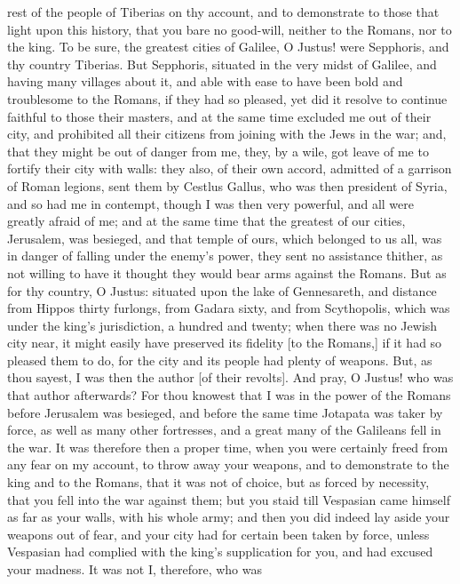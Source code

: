 rest of the people of Tiberias on thy account, and to demonstrate to those
that light upon this history, that you bare no good-will, neither to the
Romans, nor to the king. To be sure, the greatest cities of Galilee, O
Justus! were Sepphoris, and thy country Tiberias. But Sepphoris, situated
in the very midst of Galilee, and having many villages about it, and able
with ease to have been bold and troublesome to the Romans, if they had so
pleased, yet did it resolve to continue faithful to those their masters,
and at the same time excluded me out of their city, and prohibited all
their citizens from joining with the Jews in the war; and, that they might
be out of danger from me, they, by a wile, got leave of me to fortify
their city with walls: they also, of their own accord, admitted of a
garrison of Roman legions, sent them by Cestlus Gallus, who was then
president of Syria, and so had me in contempt, though I was then very
powerful, and all were greatly afraid of me; and at the same time that the
greatest of our cities, Jerusalem, was besieged, and that temple of ours,
which belonged to us all, was in danger of falling under the enemy's
power, they sent no assistance thither, as not willing to have it thought
they would bear arms against the Romans. But as for thy country, O Justus:
situated upon the lake of Gennesareth, and distance from Hippos thirty
furlongs, from Gadara sixty, and from Scythopolis, which was under the
king's jurisdiction, a hundred and twenty; when there was no Jewish city
near, it might easily have preserved its fidelity [to the Romans,] if it
had so pleased them to do, for the city and its people had plenty of
weapons. But, as thou sayest, I was then the author [of their revolts].
And pray, O Justus! who was that author afterwards? For thou knowest that
I was in the power of the Romans before Jerusalem was besieged, and before
the same time Jotapata was taker by force, as well as many other
fortresses, and a great many of the Galileans fell in the war. It was
therefore then a proper time, when you were certainly freed from any fear
on my account, to throw away your weapons, and to demonstrate to the king
and to the Romans, that it was not of choice, but as forced by necessity,
that you fell into the war against them; but you staid till Vespasian came
himself as far as your walls, with his whole army; and then you did indeed
lay aside your weapons out of fear, and your city had for certain been
taken by force, unless Vespasian had complied with the king's supplication
for you, and had excused your madness. It was not I, therefore, who was
